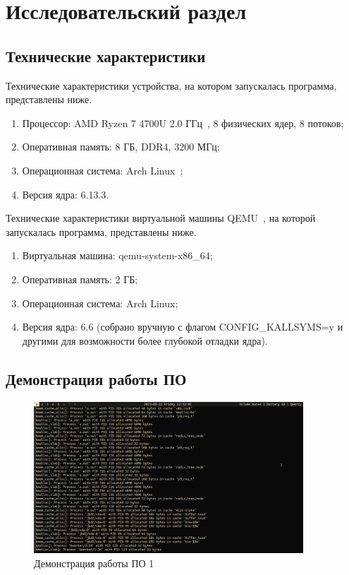 \section{Исследовательский раздел}


\subsection{Технические характеристики}

Технические характеристики устройства, на котором запускалась программа, представлены ниже.
\begin{enumerate}
    \item Процессор: {AMD Ryzen 7 4700U} 2.0 ГГц~\cite{amd}, 8 физических ядер, 8 потоков;
    \item Оперативная память: 8 ГБ, {DDR4}, 3200 МГц;
    \item Операционная система: {Arch Linux}~\cite{arch};
    \item Версия ядра: {6.13.3}.
\end{enumerate}

Технические характеристики виртуальной машины QEMU~\cite{qemu}, на которой запускалась программа, представлены ниже.
\begin{enumerate}
    \item Виртуальная машина: qemu-system-x86\_64;
    \item Оперативная память: 2 ГБ;
    \item Операционная система: {Arch Linux};
    \item Версия ядра: {6.6} (собрано вручную с флагом CONFIG\_KALLSYMS=y и другими для возможности более глубокой отладки ядра).
\end{enumerate}

\subsection{Демонстрация работы ПО}

\begin{figure}[H]
	\centering
	\includegraphics[width=0.9\textwidth]{img/out1.png}
	\caption{Демонстрация работы ПО 1}
	\label{fig:out1}
\end{figure}

